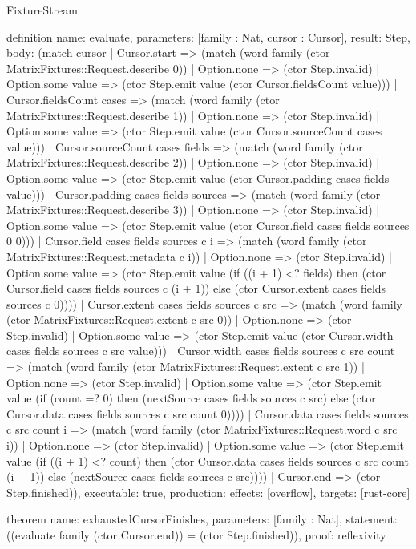 \begin{lexlean}{FixtureStream}
\begin{semanticmodule}
definition{
  name: evaluate,
  parameters: [family : Nat, cursor : Cursor],
  result: Step,
  body: (match cursor
    | Cursor.start => (match (word family (ctor MatrixFixtures::Request.describe 0))
      | Option.none => (ctor Step.invalid)
      | Option.some value => (ctor Step.emit value (ctor Cursor.fieldsCount value)))
    | Cursor.fieldsCount cases => (match (word family (ctor MatrixFixtures::Request.describe 1))
      | Option.none => (ctor Step.invalid)
      | Option.some value => (ctor Step.emit value (ctor Cursor.sourceCount cases value)))
    | Cursor.sourceCount cases fields => (match (word family (ctor MatrixFixtures::Request.describe 2))
      | Option.none => (ctor Step.invalid)
      | Option.some value => (ctor Step.emit value (ctor Cursor.padding cases fields value)))
    | Cursor.padding cases fields sources => (match (word family (ctor MatrixFixtures::Request.describe 3))
      | Option.none => (ctor Step.invalid)
      | Option.some value => (ctor Step.emit value (ctor Cursor.field cases fields sources 0 0)))
    | Cursor.field cases fields sources c i => (match (word family (ctor MatrixFixtures::Request.metadata c i))
      | Option.none => (ctor Step.invalid)
      | Option.some value => (ctor Step.emit value (if ((i + 1) <? fields) then (ctor Cursor.field cases fields sources c (i + 1)) else (ctor Cursor.extent cases fields sources c 0))))
    | Cursor.extent cases fields sources c src => (match (word family (ctor MatrixFixtures::Request.extent c src 0))
      | Option.none => (ctor Step.invalid)
      | Option.some value => (ctor Step.emit value (ctor Cursor.width cases fields sources c src value)))
    | Cursor.width cases fields sources c src count => (match (word family (ctor MatrixFixtures::Request.extent c src 1))
      | Option.none => (ctor Step.invalid)
      | Option.some value => (ctor Step.emit value (if (count =? 0) then (nextSource cases fields sources c src) else (ctor Cursor.data cases fields sources c src count 0))))
    | Cursor.data cases fields sources c src count i => (match (word family (ctor MatrixFixtures::Request.word c src i))
      | Option.none => (ctor Step.invalid)
      | Option.some value => (ctor Step.emit value (if ((i + 1) <? count) then (ctor Cursor.data cases fields sources c src count (i + 1)) else (nextSource cases fields sources c src))))
    | Cursor.end => (ctor Step.finished)),
  executable: true,
  production: {effects: [overflow], targets: [rust-core]}
}

theorem{
  name: exhaustedCursorFinishes,
  parameters: [family : Nat],
  statement: ((evaluate family (ctor Cursor.end)) = (ctor Step.finished)),
  proof: reflexivity{}
}
\end{semanticmodule}
\end{lexlean}
